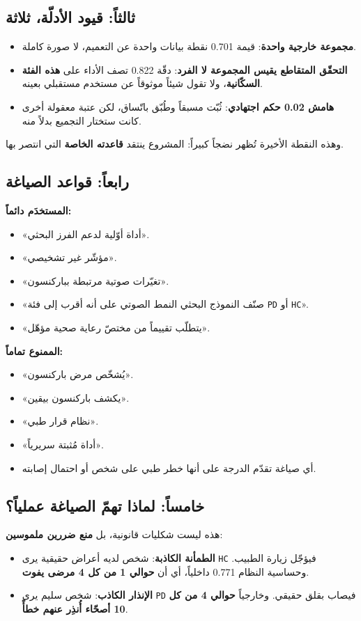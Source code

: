 \documentclass[12pt,a4paper]{report}
\newcommand{\E}[1]{\textenglish{\texttt{#1}}}
\newcommand{\N}[1]{\textenglish{#1}}
\newcommand{\qism}[1]{\subsection*{#1}}
\begin{document}
\qism{ثالثاً: قيود الأدلّة، ثلاثة}

\begin{itemize}
  \item \textbf{مجموعة خارجية واحدة}: قيمة \N{0.701} نقطة بيانات واحدة عن التعميم،
        لا صورة كاملة.
  \item \textbf{التحقّق المتقاطع يقيس المجموعة لا الفرد}: دقّة \N{0.822} تصف الأداء
        على \textbf{هذه الفئة السكّانية}، ولا تقول شيئاً موثوقاً عن مستخدم مستقبلي
        بعينه.
  \item \textbf{هامش \N{0.02} حكم اجتهادي}: ثُبّت مسبقاً وطُبّق باتّساق، لكن عتبة
        معقولة أخرى كانت ستختار التجميع بدلاً منه.
\end{itemize}

وهذه النقطة الأخيرة تُظهر نضجاً كبيراً: المشروع ينتقد \textbf{قاعدته الخاصة} التي
انتصر بها.

\qism{رابعاً: قواعد الصياغة}

\textbf{المستخدَم دائماً:}

\begin{itemize}
  \item «أداة أوّلية لدعم الفرز البحثي».
  \item «مؤشّر غير تشخيصي».
  \item «تغيّرات صوتية مرتبطة بباركنسون».
  \item «صنّف النموذج البحثي النمط الصوتي على أنه أقرب إلى فئة \E{PD} أو \E{HC}».
  \item «يتطلّب تقييماً من مختصّ رعاية صحية مؤهّل».
\end{itemize}

\textbf{الممنوع تماماً:}

\begin{itemize}
  \item «يُشخّص مرض باركنسون».
  \item «يكشف باركنسون بيقين».
  \item «نظام قرار طبي».
  \item «أداة مُثبتة سريرياً».
  \item أي صياغة تقدّم الدرجة على أنها خطر طبي على شخص أو احتمال إصابته.
\end{itemize}

\qism{خامساً: لماذا تهمّ الصياغة عملياً؟}

هذه ليست شكليات قانونية، بل \textbf{منع ضررين ملموسين}:

\begin{itemize}
  \item \textbf{الطمأنة الكاذبة}: شخص لديه أعراض حقيقية يرى \E{HC} فيؤجّل زيارة
        الطبيب. وحساسية النظام \N{0.771} داخلياً، أي أن \textbf{حوالي \N{1} من كل
        \N{4} مرضى يفوت}.
  \item \textbf{الإنذار الكاذب}: شخص سليم يرى \E{PD} فيصاب بقلق حقيقي. وخارجياً
        \textbf{حوالي \N{4} من كل \N{10} أصحّاء أُنذِر عنهم خطأً}.
\end{itemize}
\end{document}
